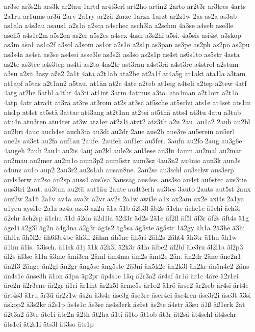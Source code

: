 {ar3se
ar3s2h
ars3k
ar2tau
1artd
ar4t3erl
art2ho
artin2
2arto
ar2t3r
ar3tres
4arts
2a1ru
ar1ums
ar3ü
2arv
2a1ry
ar2zä
2arze
1arzn
1arzt
ar2z1w
2as
as2a
as3ab
as1ala
a4s3au
asaus1
a2s1ä
a2sca
a4schec
asch3la
a2schm
4a3se
a4seb
ase3le
aseli5
a4s1e2m
a5s2en
as2er
a5s2es
a4sex
4ash
a3s2hi
a5si.
4a5sis
asi4st
a3skop
as3m
aso1
as1o2f
a3sol
a3som
as1or
a2s1ö
a2s1p
as3pan
as3pe
as2ph
as2po
as2pu
as3s4a
as4sä
as3se
as4sei
asse3le
as3s2i
as3so
as2s1p
as4st
as6s1to
as5str
4asta
as2te
as3tec
a4s3tep
as4ti
as2to
4as2tr
ast3rau
a4st3rä
a4st3re
a4strol
a2stum
a3su
a2sü
3asy
aße2
2a1t
4ata
a2t1ab
ata2be
at2a1f
at4a5g
at1akt
ata1la
a3tam
at1apf
a5tas
a2t1au2
a5tau.
at1än
at2c
4ate
a2teb
at1eig
a4teli
a2tep
a2tew
4atf
4atg
at2he
5athl
a4thr
4a3ti
at1int
3atm
4atmus
a3to.
ato4man
a2t1ort
a2t1ö
4atp
4atr
atra4t
at3rä
at3re
at3rom
at2s
at3sc
at5sche
at5schü
ats1e
at4set
ats1in
ats1p
at4st
at5stä
3attac
att3ang
at2t1au
at2tei
at5thä
atts4
at3tu
4atu
a3tub
atu4n
atu3ren
atu4rer
at3w
atz1er
at2z1i
atzt2
atz3th
a2u
2au.
au1a2
2aub
au2bl
au2bri
4auc
auch4se
auch3ta
au3di
au2dr
2aue
aue2b
aue3re
au5erein
au5erl
aue2s
au3et
au2fa
auf1an
2aufe.
2aufeh
auf1er
au5fer.
3aufn
au2fo
2aug
au3g6e
4augeh
2auh
2au1i
au2is
4auj
au2kl
aule2s
aul3ese
au3lü
4aum
au2mal
au2mar
au2mau
au2mer
au2m1o
aum3p2
aum5str
aum3sz
4au3n2
au4nio
aun3k
aun3s
a4unz
au1o
aup2
2au3r2
au2s1ah
ausan8ne.
2au2sc
au3schl
au3schw
aus3erp
au4s3erw
au2so
au2sp
auss4
aus7sa
3aussag
aus4se.
aus3so
au4st
au6stec
aus3tie
aus3tri
2aut.
au3tan
au2tä
aut1äu
2aute
au4t3erh
au3tes
3auto
2auts
aut5st
2aux
auz2w
2a1ü
2a1v
av4a
ava3t
a2vr
av2s
2a1w
awi3e
a1x
ax2am
ax2e
axi4s
2a1ya
a1yeu
aysi1e
2a1z
az4a
azo3
az2u
ä1a
ä1b
ä2b3l
äb2s
ä1che
äche1e
ä1chi
äch3l
ä2chr
äch2sp
ä1chu
ä1d
ä2da
ä2d1ia
ä2d3r
äd2s
2ä1e
äf2fl
äf5l
äf3r
äf2s
äft4s
ä1g
äge1i
ä2g3l
äg2n
ä4g3na
ä2g3r
äg4s2
äg5sa
äg5ste
äg5str
1ä2gy
äh1a
2ä3he
ä3hi
ähl1a
äh5l2e
äh6l3e4be
äh3li
2ähm
äh5ne
äh5ri
2äh2s
2äht4
äh3tr
ä1hu
äh1w
ä1im
ä1is.
ä3isch.
ä1isk
ä1j
ä1k
ä2k3l
ä2k3r
ä1la
älbe2
äl2bl
äle3ru
äl2l1a
äl2p3
äl2s
äl3se
ä1lu
ä3me
ämi3en
2äml
äm4ma
äm2s
ämt2e
2än.
än2dr
2äne
äne2n1
än2f3
2änge
än2gl
än2gr
äng5se
äng5ste
2ä3ni
än5k2e
än2k3l
än2kr
än5n4e2
2äns
än4s1c
änse3h
ä1on
ä1pa
äp2pr
äp4s1c
1äq
ä2r3a2
är4af
är1ä
är1c
4äre
ä2r1ei
äre2n
ä2r3ene
är2gr
ä1ri
är1int
är2k5l
ärme5s
är1o2
ä1rö
ärse2
är2seb
är4si
ärt4e
ärt4s3
ä1ru
är3ü
är2z1w
äs2a
ä3s4e
äse3g
äse3re
äser4ei
äse4ren
äse3r2i
äse3t
ä3si
äskop2
ä3s2kr
ä2s1p
äs4s1c
äs3se
äs4s3erk
äs6st
äs2te
ä4str
ä3su
ä1ß
äß1erk
2ät
ä2t3a2
ä3te
äte1i
äte2n
ä2th
ät2ha
ä1ti
ä1to
ät1ob
ät3r
ät2sä
ät4schl
ät4schr
äts1ei
ät2s1i
äts3l
ät3so
äts1p
}
